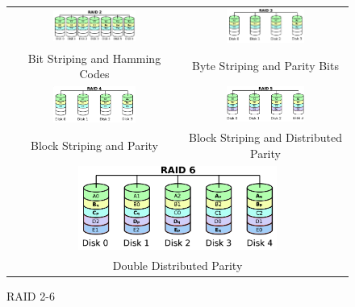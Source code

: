\begin{figure}[H]
  \centering
  \begin{tabular}{cc}
    \includegraphics[width=0.5\textwidth]{images/raid2} &
    \includegraphics[width=0.5\textwidth]{images/raid3}\\
    Bit Striping and Hamming Codes & Byte Striping and Parity Bits\\
    \includegraphics[width=0.5\textwidth]{images/raid4} &
    \includegraphics[width=0.5\textwidth]{images/raid5}\\
    Block Striping and Parity & Block Striping and Distributed Parity\\
    \multicolumn{2}{c}{\includegraphics[width=0.6\textwidth]{images/raid6}}\\
    \multicolumn{2}{c}{Double Distributed Parity}
  \end{tabular}
  \caption{RAID 2-6}
  \label{raid2-6}
\end{figure}

